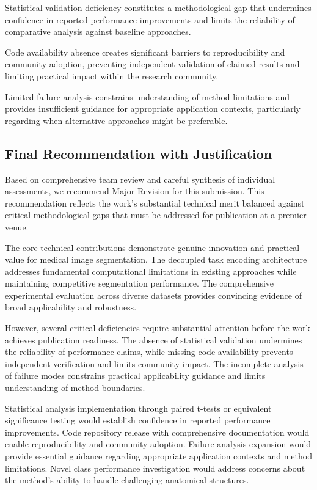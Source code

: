 Statistical validation deficiency constitutes a methodological gap that undermines confidence in reported performance improvements and limits the reliability of comparative analysis against baseline approaches.

Code availability absence creates significant barriers to reproducibility and community adoption, preventing independent validation of claimed results and limiting practical impact within the research community.

Limited failure analysis constrains understanding of method limitations and provides insufficient guidance for appropriate application contexts, particularly regarding when alternative approaches might be preferable.

\subsection{Final Recommendation with Justification}
Based on comprehensive team review and careful synthesis of individual assessments, we recommend Major Revision for this submission. This recommendation reflects the work's substantial technical merit balanced against critical methodological gaps that must be addressed for publication at a premier venue.

The core technical contributions demonstrate genuine innovation and practical value for medical image segmentation. The decoupled task encoding architecture addresses fundamental computational limitations in existing approaches while maintaining competitive segmentation performance. The comprehensive experimental evaluation across diverse datasets provides convincing evidence of broad applicability and robustness.

However, several critical deficiencies require substantial attention before the work achieves publication readiness. The absence of statistical validation undermines the reliability of performance claims, while missing code availability prevents independent verification and limits community impact. The incomplete analysis of failure modes constrains practical applicability guidance and limits understanding of method boundaries.

Statistical analysis implementation through paired t-tests or equivalent significance testing would establish confidence in reported performance improvements. Code repository release with comprehensive documentation would enable reproducibility and community adoption. Failure analysis expansion would provide essential guidance regarding appropriate application contexts and method limitations. Novel class performance investigation would address concerns about the method's ability to handle challenging anatomical structures.

